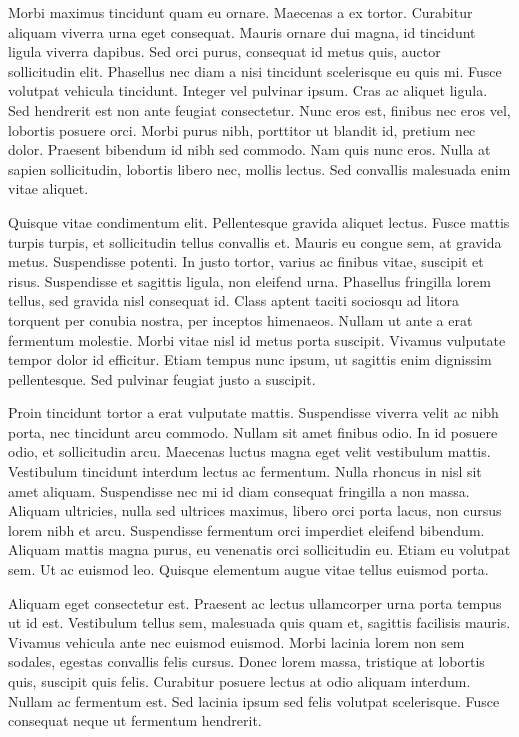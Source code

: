 Morbi maximus tincidunt quam eu ornare. Maecenas a ex tortor. Curabitur aliquam
viverra urna eget consequat. Mauris ornare dui magna, id tincidunt ligula
viverra dapibus. Sed orci purus, consequat id metus quis, auctor sollicitudin
elit. Phasellus nec diam a nisi tincidunt scelerisque eu quis mi. Fusce volutpat
vehicula tincidunt. Integer vel pulvinar ipsum. Cras ac aliquet ligula. Sed
hendrerit est non ante feugiat consectetur. Nunc eros est, finibus nec eros vel,
lobortis posuere orci. Morbi purus nibh, porttitor ut blandit id, pretium nec
dolor. Praesent bibendum id nibh sed commodo. Nam quis nunc eros. Nulla at
sapien sollicitudin, lobortis libero nec, mollis lectus. Sed convallis malesuada
enim vitae aliquet.

Quisque vitae condimentum elit. Pellentesque gravida aliquet lectus. Fusce
mattis turpis turpis, et sollicitudin tellus convallis et. Mauris eu congue sem,
at gravida metus. Suspendisse potenti. In justo tortor, varius ac finibus vitae,
suscipit et risus. Suspendisse et sagittis ligula, non eleifend urna. Phasellus
fringilla lorem tellus, sed gravida nisl consequat id. Class aptent taciti
sociosqu ad litora torquent per conubia nostra, per inceptos himenaeos. Nullam
ut ante a erat fermentum molestie. Morbi vitae nisl id metus porta
suscipit. Vivamus vulputate tempor dolor id efficitur. Etiam tempus nunc ipsum,
ut sagittis enim dignissim pellentesque. Sed pulvinar feugiat justo a suscipit.

Proin tincidunt tortor a erat vulputate mattis. Suspendisse viverra velit ac
nibh porta, nec tincidunt arcu commodo. Nullam sit amet finibus odio. In id
posuere odio, et sollicitudin arcu. Maecenas luctus magna eget velit vestibulum
mattis. Vestibulum tincidunt interdum lectus ac fermentum. Nulla rhoncus in nisl
sit amet aliquam. Suspendisse nec mi id diam consequat fringilla a non
massa. Aliquam ultricies, nulla sed ultrices maximus, libero orci porta lacus,
non cursus lorem nibh et arcu. Suspendisse fermentum orci imperdiet eleifend
bibendum. Aliquam mattis magna purus, eu venenatis orci sollicitudin eu. Etiam
eu volutpat sem. Ut ac euismod leo. Quisque elementum augue vitae tellus euismod
porta.

Aliquam eget consectetur est. Praesent ac lectus ullamcorper urna porta tempus
ut id est. Vestibulum tellus sem, malesuada quis quam et, sagittis facilisis
mauris. Vivamus vehicula ante nec euismod euismod. Morbi lacinia lorem non sem
sodales, egestas convallis felis cursus. Donec lorem massa, tristique at
lobortis quis, suscipit quis felis. Curabitur posuere lectus at odio aliquam
interdum. Nullam ac fermentum est. Sed lacinia ipsum sed felis volutpat
scelerisque. Fusce consequat neque ut fermentum hendrerit.

